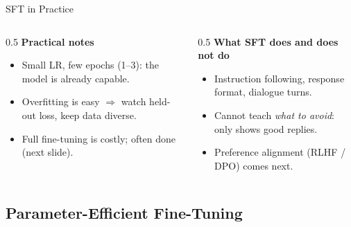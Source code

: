\begin{frame}{SFT in Practice}
  \begin{algorithm}[H]
  \small
  \caption{Supervised Fine-Tuning}
  \end{algorithm}

  \vspace{0.3em}
  \begin{columns}[T]
    \begin{column}{0.5\textwidth}
      \textbf{Practical notes}
      \begin{itemize}[nosep]
        \item Small LR, few epochs (1--3): the model is already capable.
        \item Overfitting is easy $\Rightarrow$ watch held-out loss, keep data diverse.
        \item Full fine-tuning is costly; often done  (next slide).
      \end{itemize}
    \end{column}
    \begin{column}{0.5\textwidth}
      \textbf{What SFT does and does not do}
      \begin{itemize}[nosep]
        \item[\checkmark] Instruction following, response format, dialogue turns.
        \item[$\times$] Cannot teach \emph{what to avoid}: only shows good replies.
        \item[$\Rightarrow$] Preference alignment (RLHF / DPO) comes next.
      \end{itemize}
    \end{column}
  \end{columns}
\end{frame}

\subsection{Parameter-Efficient Fine-Tuning}


